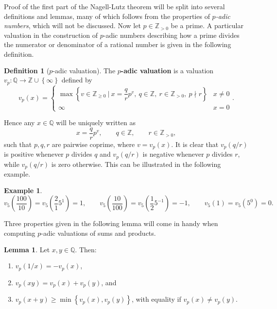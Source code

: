 \documentclass{article}
\newcommand{\Z}{\mathbb{Z}}
\newcommand{\Q}{\mathbb{Q}}
\newcommand{\rb}[1]{\left( #1 \right)}
\newcommand{\cb}[1]{\left\{ #1 \right\}}
\theoremstyle{definition}\newtheorem*{definition}{Definition}
\theoremstyle{definition}\newtheorem*{example}{Example}
\theoremstyle{definition}\newtheorem*{remark}{Remark}
\newtheorem{lemma}[proposition]{Lemma}
\begin{document}
Proof of the first part of the Nagell-Lutz theorem will be split into several definitions and lemmas, many of which follows from the properties of \emph{$ p $-adic numbers}, which will not be discussed. Now let $ p \in \Z_{> 0} $ be a prime. A particular valuation in the construction of $ p $-adic numbers describing how a prime divides the numerator or denominator of a rational number is given in the following definition.

\begin{definition}[$ p $-adic valuation]
The \textbf{$ p $-adic valuation} is a valuation $ v_p : \Q \to \Z \cup \cb{\infty} $ defined by
$$ v_p\rb{x} = \begin{cases} \max\cb{v \in \Z_{\ge 0} \ \Big| \ x = \dfrac{q}{r}p^v, \ q \in \Z, \ r \in \Z_{> 0}, \ p \nmid r} & x \ne 0 \\ \infty & x = 0 \end{cases}. $$
\end{definition}

Hence any $ x \in \Q $ will be uniquely written as
$$ x = \dfrac{q}{r}p^v, \qquad q \in \Z, \qquad r \in \Z_{> 0}, $$
such that $ p, q, r $ are pairwise coprime, where $ v = v_p\rb{x} $. It is clear that $ v_p\rb{q / r} $ is positive whenever $ p $ divides $ q $ and $ v_p\rb{q / r} $ is negative whenever $ p $ divides $ r $, while $ v_p\rb{q / r} $ is zero otherwise. This can be illustrated in the following example.

\begin{example}
$$ v_5\rb{\dfrac{100}{10}} = v_5\rb{\dfrac{2}{1}5^1} = 1, \qquad v_5\rb{\dfrac{10}{100}} = v_5\rb{\dfrac{1}{2}5^{-1}} = -1, \qquad v_5\rb{1} = v_5\rb{5^0} = 0. $$
\end{example}

Three properties given in the following lemma will come in handy when computing $ p $-adic valuations of sums and products.

\begin{lemma}
Let $ x, y \in \Q $. Then:
\begin{enumerate}
\item $ v_p\rb{1 / x} = -v_p\rb{x} $,
\item $ v_p\rb{xy} = v_p\rb{x} + v_p\rb{y} $, and
\item $ v_p\rb{x + y} \ge \min\cb{v_p\rb{x}, v_p\rb{y}} $, with equality if $ v_p\rb{x} \ne v_p\rb{y} $.
\end{enumerate}
\end{lemma}
\end{document}
